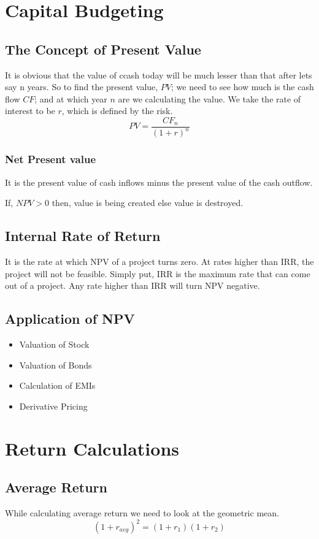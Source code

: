 \documentclass{article}
\begin{document}
\section{Capital Budgeting}
\subsection{The Concept of Present Value}
It is obvious that the value of ccash today will be much lesser than that after lets say n years. So to find the present value, $PV$; we need to see how much is the cash flow $CF$; and at which year $n$ are we calculating the value. We take the rate of interest to be $r$, which is defined by the risk. 
$$PV = \frac{CF_n}{(1+r)^n}$$
\subsubsection{Net Present value}
It is the present value of cash inflows minus the present value of the cash outflow.\par
If, $NPV>0$ then, value is being created else value is destroyed.

\subsection{Internal Rate of Return}
It is the rate at which NPV of a project turns zero. At rates higher than IRR, the project will not be feasible. Simply put, IRR is the maximum rate that can come out of a project. Any rate higher than IRR will turn NPV negative. 
\subsection{Application of NPV}
\begin{itemize}
    \item Valuation of Stock
    \item Valuation of Bonds
    \item Calculation of EMIs
    \item Derivative Pricing
\end{itemize}

\section{Return Calculations}
\subsection{Average Return}
While calculating average return we need to look at the geometric mean.
$$(1+r_{avg})^2 = (1+r_1)(1+r_2)$$
\end{document}
